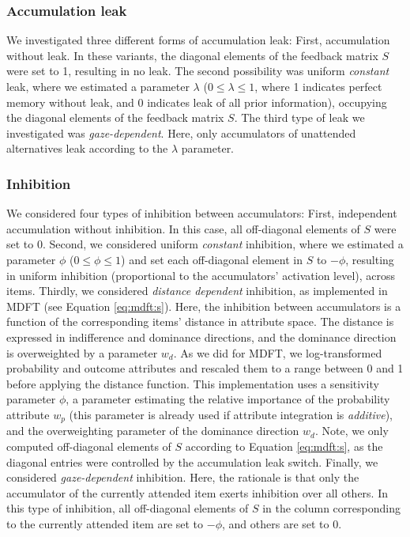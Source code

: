 \documentclass[11pt, a4paper]{article}
\begin{document}
\subsubsection*{Accumulation leak}
We investigated three different forms of accumulation leak: First, accumulation without leak. In these variants, the diagonal elements of the feedback matrix $S$ were set to 1, resulting in no leak. The second possibility was uniform \emph{constant} leak, where we estimated a parameter $\lambda$ ($0 \le \lambda \le 1$, where 1 indicates perfect memory without leak, and 0 indicates leak of all prior information), occupying the diagonal elements of the feedback matrix $S$.
The third type of leak we investigated was \emph{gaze-dependent}. Here, only accumulators of unattended alternatives leak according to the $\lambda$ parameter.

\subsubsection*{Inhibition}
We considered four types of inhibition between accumulators: First, independent accumulation without inhibition. In this case, all off-diagonal elements of $S$ were set to 0.
Second, we considered uniform \emph{constant} inhibition, where we estimated a parameter $\phi$ ($0 \le \phi \le 1$) and set each off-diagonal element in $S$ to $-\phi$, resulting in uniform inhibition (proportional to the accumulators' activation level), across items.
Thirdly, we considered \emph{distance dependent} inhibition, as implemented in MDFT (see Equation \ref{eq:mdft:s}). Here, the inhibition between accumulators is a function of the corresponding items' distance in attribute space. The distance is expressed in indifference and dominance directions, and the dominance direction is overweighted by a parameter $w_d$. As we did for MDFT, we log-transformed probability and outcome attributes and rescaled them to a range between 0 and 1 before applying the distance function. 
This implementation uses a sensitivity parameter $\phi$, a parameter estimating the relative importance of the probability attribute $w_p$ (this parameter is already used if attribute integration is \emph{additive}), and the overweighting parameter of the dominance direction $w_d$. Note, we only computed off-diagonal elements of $S$ according to Equation \ref{eq:mdft:s}, as the diagonal entries were controlled by the accumulation leak switch.
Finally, we considered \emph{gaze-dependent} inhibition. Here, the rationale is that only the accumulator of the currently attended item exerts inhibition over all others. In this type of inhibition, all off-diagonal elements of $S$ in the column corresponding to the currently attended item are set to $-\phi$, and others are set to 0.
\end{document}
